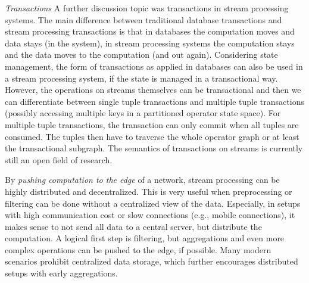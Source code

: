 \emph{Transactions} A further discussion topic was transactions in stream processing systems.
The main difference between traditional database transactions and stream
processing transactions is that in databases the computation moves and
data stays (in the system), in stream processing systems the computation stays
and the data moves to the computation (and out again). Considering state management, the form of transactions as applied in databases
can also be used in a stream processing system, if the state is managed in a
transactional way. However, the operations on streams themselves can be
transactional and then we can differentiate between single tuple transactions
and multiple tuple transactions (possibly accessing multiple keys in a partitioned operator state space). For multiple tuple transactions, the
transaction can only commit when all tuples are consumed. The tuples then have
to traverse the whole operator graph or at least the transactional subgraph. The semantics of transactions on streams is currently still an open
field of research.

By \emph{pushing computation to the edge} of a network, stream processing can
be highly distributed and decentralized. This is very useful when preprocessing
or filtering can be done without a centralized view of the data. Especially, in
setups with high communication cost or slow connections (e.g., mobile
connections), it makes sense to not send all data to a central server, but
distribute the computation. A logical first step is filtering, but aggregations
and even more complex operations can be pushed to the edge, if possible. Many
modern scenarios prohibit centralized data storage, which further encourages
distributed setups with early aggregations. \iffalse Primary points of research are the
declarativity for specifying highly distributed data processing programs and
the architecture of systems to support these use cases.\fi

\iffalse
\emph{Other topics discussed} were ad hoc queries and graph stream processing.
Most current systems only discuss long running queries, but in many use cases
(e.g., sports, automotive) streams can be short lived as can be stream queries.
\fi